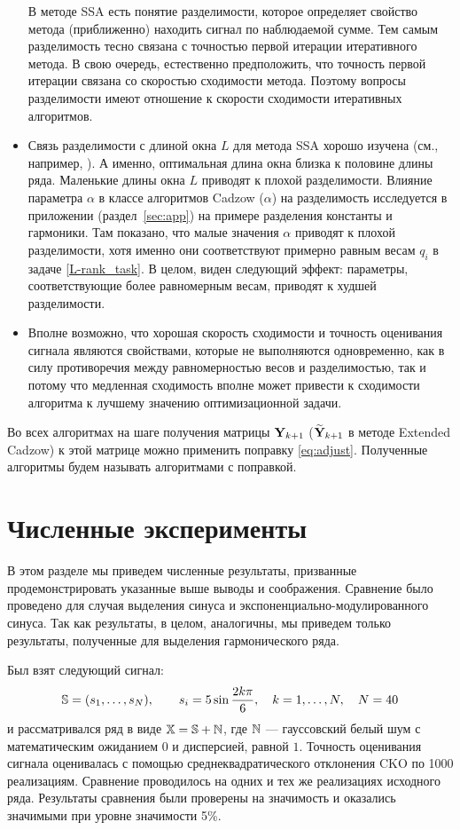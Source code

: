 \documentclass[12pt,a4paper,fleqn,leqno]{article}
\begin{document}
\begin{itemize}
В методе SSA есть понятие разделимости, которое определяет свойство метода (приближенно) находить сигнал по наблюдаемой сумме. Тем самым разделимость
тесно связана с точностью первой итерации итеративного метода. В свою очередь, естественно предположить, что точность первой итерации связана со скоростью сходимости метода. Поэтому вопросы разделимости имеют отношение к скорости сходимости итеративных алгоритмов.
\item
Связь разделимости с длиной окна $L$ для метода SSA хорошо изучена (см., например, \cite{Golyandina2010}). А именно, оптимальная длина окна близка
к половине длины ряда. Маленькие длины окна $L$ приводят к плохой разделимости. Влияние параметра $\alpha$ в классе алгоритмов
Cadzow ($\alpha$) на разделимость исследуется в приложении (раздел~\ref{sec:app}) на примере разделения константы и гармоники. Там показано, что малые значения
$\alpha$ приводят к плохой разделимости, хотя именно они соответствуют примерно равным весам $q_i$ в задаче \eqref{L-rank_task}.
В целом, виден следующий эффект: параметры, соответствующие более равномерным весам, приводят к худшей разделимости.
\item
Вполне возможно, что хорошая скорость сходимости и точность оценивания сигнала являются свойствами, которые не выполняются одновременно, как в силу
противоречия между равномерностью весов и разделимостью, так и потому что медленная сходимость вполне может привести к сходимости алгоритма к лучшему значению оптимизационной задачи.
\end{itemize}

\begin{remark}
\label{rem:adjust}
Во всех алгоритмах на шаге получения матрицы $\mathbf{Y}_{k+1}$ ($\widetilde{\mathbf{Y}}_{k+1}$ в методе Extended Cadzow) к этой матрице
можно применить поправку \eqref{eq:adjust}. Полученные алгоритмы будем называть алгоритмами с поправкой.
\end{remark}

\section{Численные эксперименты}
\label{sec:simul}
В этом разделе мы приведем численные результаты, призванные продемонстрировать указанные выше выводы и соображения.
Сравнение было проведено для случая выделения синуса и экспоненциально-модулированного синуса.
Так как результаты, в целом, аналогичны, мы приведем только результаты, полученные для выделения гармонического ряда.

Был взят следующий сигнал:
\begin{equation*}
\mathbb{S} = (s_{1}, \ldots, s_N), \qquad s_{i} = 5\sin{\frac{2 k \pi}{6}}, \quad k = 1, \ldots, N, \quad N = 40
\end{equation*}
и рассматривался ряд в виде $\mathbb{X} = \mathbb{S} + \mathbb{N}$, где  $\mathbb{N}$ --- гауссовский белый шум с математическим ожиданием $0$ и дисперсией, равной $1$.
Точность оценивания сигнала оценивалась с помощью среднеквадратического отклонения CKO по 1000 реализациям.
Сравнение проводилось на одних и тех же реализациях исходного ряда. Результаты сравнения были проверены на значимость и оказались значимыми
при уровне значимости 5\%. %
\end{document}
